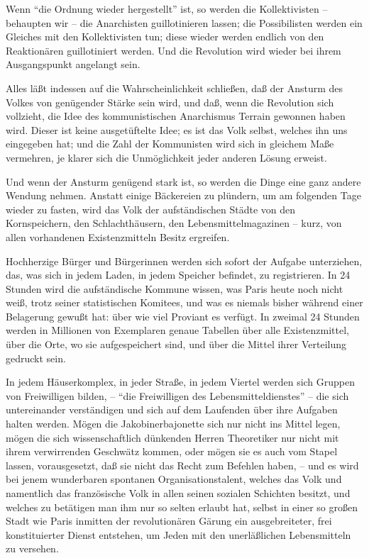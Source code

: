 \documentclass{scrbook}
\begin{document}
Wenn ``die Ordnung wieder hergestellt'' ist, so werden die Kollektivisten – behaupten wir – die Anarchisten guillotinieren lassen; die Possibilisten werden ein Gleiches mit den Kollektivisten tun; diese wieder werden endlich von den Reaktionären guillotiniert werden. Und die Revolution wird wieder bei ihrem Ausgangspunkt angelangt sein.

Alles läßt indessen auf die Wahrscheinlichkeit schließen, daß der Ansturm des Volkes von genügender Stärke sein wird, und daß, wenn die Revolution sich vollzieht, die Idee des kommunistischen Anarchismus Terrain gewonnen haben wird. Dieser ist keine ausgetüftelte Idee; es ist das Volk selbst, welches ihn uns eingegeben hat; und die Zahl der Kommunisten wird sich in gleichem Maße vermehren, je klarer sich die Unmöglichkeit jeder anderen Lösung erweist.

Und wenn der Ansturm genügend stark ist, so werden die Dinge eine ganz andere Wendung nehmen. Anstatt einige Bäckereien zu plündern, um am folgenden Tage wieder zu fasten, wird das Volk der aufständischen Städte von den Kornspeichern, den Schlachthäusern, den Lebensmittelmagazinen – kurz, von allen vorhandenen Existenzmitteln Besitz ergreifen.

Hochherzige Bürger und Bürgerinnen werden sich sofort der Aufgabe unterziehen, das, was sich in jedem Laden, in jedem Speicher befindet, zu registrieren. In 24 Stunden wird die aufständische Kommune wissen, was Paris heute noch nicht weiß, trotz seiner statistischen Komitees, und was es niemals bisher während einer Belagerung gewußt hat: über wie viel Proviant es verfügt. In zweimal 24 Stunden werden in Millionen von Exemplaren genaue Tabellen über alle Existenzmittel, über die Orte, wo sie aufgespeichert sind, und über die Mittel ihrer Verteilung gedruckt sein.

In jedem Häuserkomplex, in jeder Straße, in jedem Viertel werden sich Gruppen von Freiwilligen bilden, – ``die Freiwilligen des Lebensmitteldienstes'' – die sich untereinander verständigen und sich auf dem Laufenden über ihre Aufgaben halten werden. Mögen die Jakobinerbajonette sich nur nicht ins Mittel legen, mögen die sich wissenschaftlich dünkenden Herren Theoretiker nur nicht mit ihrem verwirrenden Geschwätz kommen, oder mögen sie es auch vom Stapel lassen, vorausgesetzt, daß sie nicht das Recht zum Befehlen haben, – und es wird bei jenem wunderbaren spontanen Organisationstalent, welches das Volk und namentlich das französische Volk in allen seinen sozialen Schichten besitzt, und welches zu betätigen man ihm nur so selten erlaubt hat, selbst in einer so großen Stadt wie Paris inmitten der revolutionären Gärung ein ausgebreiteter, frei konstituierter Dienst entstehen, um Jeden mit den unerläßlichen Lebensmitteln zu versehen.
\end{document}
